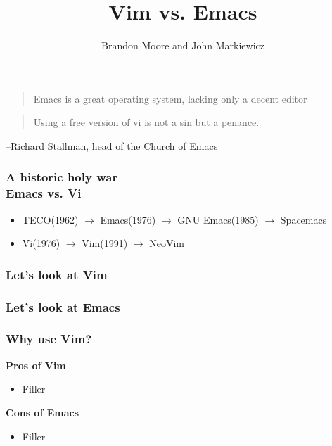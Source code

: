 \documentclass[8pt]{beamer}
\title{Vim vs. Emacs}
\author{Brandon Moore and John Markiewicz}
\date{}
\begin{document}
\begin{frame}
	\titlepage
\end{frame}

\begin{frame}
  \begin{quote}
    Emacs is a great operating system, lacking only a decent editor
  \end{quote}
\end{frame}

\begin{frame}
  \begin{quote}
    Using a free version of vi is not a sin but a penance.
  \end{quote}
  \begin{flushright}
    --Richard Stallman, head of the Church of Emacs
  \end{flushright}
\end{frame}

\begin{frame}
  \frametitle{A historic holy war\\Emacs vs. Vi}
  \begin{itemize}
  \item TECO(1962) $\rightarrow$ Emacs(1976) $\rightarrow$ GNU Emacs(1985) $\rightarrow$ Spacemacs
  \item Vi(1976) $\rightarrow$ Vim(1991) $\rightarrow$ NeoVim
  \end{itemize}
\end{frame}

\begin{frame}
  \frametitle{Let's look at Vim}
\end{frame}

\begin{frame}
  \frametitle{Let's look at Emacs}
\end{frame}

\begin{frame}
  \frametitle{Why use Vim?}
  \begin{multicols}{2}
    \textbf{Pros of Vim}
    \begin{itemize}
    \item Filler
    \end{itemize}
    \columnbreak
    \textbf{Cons of Emacs}
    \begin{itemize}
    \item Filler
    \end{itemize}
  \end{multicols}
\end{frame}
\end{document}
